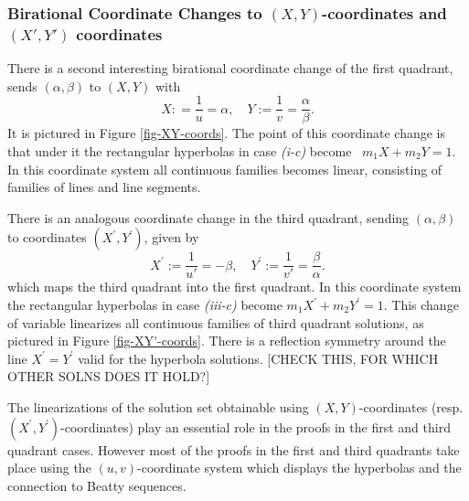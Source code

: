 \documentclass[12pt,letterpaper, reqno]{amsart}
\theoremstyle{definition}
\theoremstyle{remark}
\newcommand{\uu}{{u'}}
\newcommand{\vv}{{v'}}
\begin{document}
%
%
\subsubsection{Birational Coordinate Changes to $(X, Y)$-coordinates and $(X', Y')$ coordinates}\label{sec:132}
There is  a second interesting  birational coordinate change of the first quadrant, 
sends  $(\alpha, \beta)$
to $(X, Y)$ with 
$$X : = \frac{1}{u}= \alpha, \quad Y :=  \frac{1}{v}= \frac{\alpha}{\beta}.$$  
 It is pictured in Figure \ref{fig-XY-coords}. The point of this coordinate change is that under it  the 
 rectangular hyperbolas in case {\it (i-c)} become
\, $m_1 X + m_2 Y =1.$
In this coordinate system all continuous families  
becomes   linear,  consisting of 
 families of lines and line segments. 

There is an analogous coordinate change in the third quadrant, sending $(\alpha, \beta)$
to coordinates $(X^{'}, Y^{'})$, given by
$$ X^{'} := \frac{1}{\uu} = -\beta, \quad Y^{'} := \frac1{\vv} = \frac{\beta}{\alpha}.$$
which maps the third quadrant into the first quadrant.  
In this coordinate system the   rectangular hyperbolas in case {\it (iii-c)} become
$ m_1 X^{'} + m_2 Y^{'} =1$.
This change of variable linearizes all continuous families of third quadrant solutions,
as pictured in Figure \ref{fig-XY'-coords}. 
There is a reflection symmetry  around the line $X^{'} = Y^{'}$ valid for the hyperbola solutions.
[CHECK THIS, FOR WHICH OTHER SOLNS DOES IT HOLD?]

The linearizations of the solution set obtainable using $(X,Y)$-coordinates (resp. $(X^{'}, Y^{'})$-coordinates)
play an essential role in the proofs in the first and third quadrant cases. However 
most of the proofs in the first and third quadrants take place using  
the $(u, v)$-coordinate system which  displays the hyperbolas and the  connection to Beatty sequences.
\end{document}
